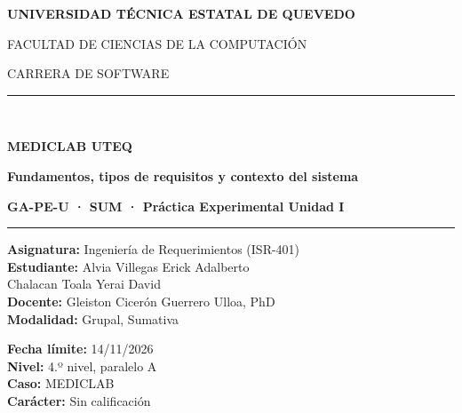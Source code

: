 \spanishplainpercent %
\hypersetup{pageanchor=false}
\begin{titlepage}
\centering
\vspace*{1.0cm}
{\Large\bfseries UNIVERSIDAD TÉCNICA ESTATAL DE QUEVEDO\par}
\vspace{0.25cm}
{\large FACULTAD DE CIENCIAS DE LA COMPUTACIÓN\par}
{\large CARRERA DE SOFTWARE\par}
\vspace{0.6cm}
\rule{\linewidth}{0.7mm}\\[0.2cm]
{\Huge\bfseries MEDICLAB UTEQ\par}
\vspace{0.2cm}
{\LARGE\bfseries Fundamentos, tipos de requisitos y contexto del sistema\par}
\vspace{0.25cm}
{\large\bfseries GA-PE-U · SUM · Práctica Experimental Unidad I\par}
\rule{\linewidth}{0.7mm}

\vspace{1.0cm}


\vspace{1.0cm}

\begin{minipage}{0.48\textwidth}
        \begin{flushleft} \large
            \textbf{Asignatura:} Ingeniería de Requerimientos (ISR-401)\\
            \textbf{Estudiante:} Alvia Villegas Erick Adalberto\\ 
             Chalacan Toala Yerai David\\
            \textbf{Docente:} Gleiston Cicerón Guerrero Ulloa, PhD\\
            \textbf{Modalidad:} Grupal, Sumativa
        \end{flushleft}
    \end{minipage}
    \begin{minipage}{0.48\textwidth}
        \begin{flushright} \large
            \textbf{Fecha límite:} 14/11/2026\\
            \textbf{Nivel:} 4.º nivel, paralelo A\\
            \textbf{Caso:} MEDICLAB\\
            \textbf{Carácter:} Sin calificación
        \end{flushright}
    \end{minipage}


\end{titlepage}
